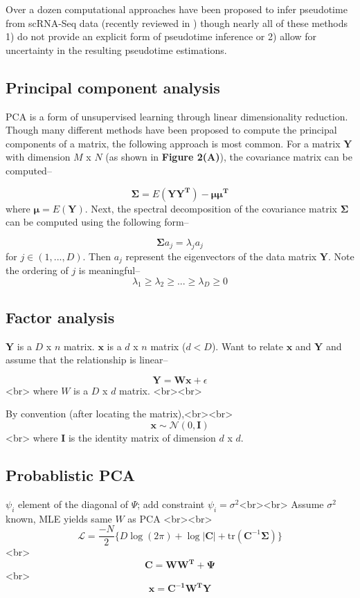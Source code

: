 \documentclass[english, 11pt]{article}\usepackage[]{graphicx}\usepackage[]{color}
\begin{document}
Over a dozen computational approaches have been proposed to infer pseudotime from scRNA-Seq data (recently reviewed in \cite{cannoodt2016computational}) though nearly all of these methods 1) do not provide an explicit form of pseudotime inference or 2) allow for uncertainty in the resulting pseudotime estimations. 

\subsection{Principal component analysis}

PCA is a form of unsupervised learning through linear dimensionality reduction. Though many different methods have been proposed to compute the principal components of a matrix, the following approach is most common. For a matrix $\mathbf{Y}$ with dimension $M$ x $N$  (as shown in \textbf{Figure 2(A)}), the covariance matrix can be computed--

$$ \mathbf{\Sigma} = E(\mathbf{YY^{T}}) - \mathbf{\mu \mu^T}$$
where $\mathbf{\mu} = E(\mathbf{Y})$. Next, the spectral decomposition of the covariance matrix $\mathbf{\Sigma}$ can be computed using the following form--

$$\mathbf{\Sigma} a_j = \lambda_j a_j$$
for $j \in (1, ..., D)$. Then $a_j$ represent the eigenvectors of the data matrix $\mathbf{Y}$. Note the ordering of $j$ is meaningful-- 
$$ \lambda_1 \geq \lambda_2 \geq ... \geq \lambda_D \geq 0$$

\subsection{Factor analysis}

$\mathbf{Y}$ is a $D$ x $n$ matrix. $\mathbf{x}$ is a $d$ x $n$ matrix ($d < D$). Want to relate $\mathbf{x}$ and $\mathbf{Y}$ and assume that the relationship is linear--

$$ \mathbf{Y = Wx} + \epsilon$$<br>
where $W$ is a $D$ x $d$ matrix. <br><br>

By convention (after locating the matrix),<br><br> $$\mathbf{x} \sim \mathcal{N} (0, \mathbf{I})$$<br>
where $\mathbf{I}$ is the identity matrix of dimension $d$ x $d$. 

\subsection{Probablistic PCA}

$\psi_i$ element of the diagonal of $\Psi$; add constraint $\psi_i = \sigma^2$<br><br>
Assume $\sigma^2$ known, MLE yields same $W$ as PCA <br><br>
$$  \mathcal{L} = \frac{-N}{2}\{ D\log(2\pi) + \log|\mathbf{C}| + \textrm{tr}(\mathbf{C}^{-1}\mathbf{\Sigma})  \}   $$<br>
$$\mathbf{C} = \mathbf{WW^T }+ \mathbf{\Psi} $$ <br>
$$  \mathbf{x} = \mathbf{C^{-1}W^{T}Y}$$
\end{document}
